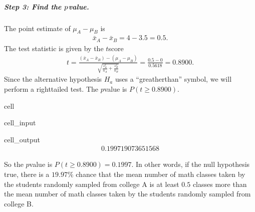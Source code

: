 \documentclass[letterpaper,10pt,english]{jupyterBook}
\begin{document}
\subparagraph{Step 3: Find the  \protect\(p\protect\)\sphinxhyphen{}value.}
\label{\detokenize{Ch9 Hypothesis Tests of Two or More Populations/9.1 Hypothesis Testing Two Population Means:step-3-find-the-p-value}}
\sphinxAtStartPar
The point estimate of \(\mu_A - \mu_B\) is
\begin{equation*}
\begin{split} \bar{x}_A - \bar{x}_B = 4 - 3.5 = 0.5. \end{split}
\end{equation*}
\sphinxAtStartPar
The test statistic is given by the \(t\)\sphinxhyphen{}score
\begin{equation*}
\begin{split} t = \frac{(\bar{x}_A - \bar{x}_B) - (\mu_A - \mu_B)}{\sqrt{\frac{s_A^2}{n_A} + \frac{s_B^2}{n_B}}} = \frac{0.5 - 0}{0.5618} = 0.8900. \end{split}
\end{equation*}
\sphinxAtStartPar
Since the alternative hypothesis \(H_a\) uses a “greather\sphinxhyphen{}than” symbol, we will perform a right\sphinxhyphen{}tailed test. The \(p\)\sphinxhyphen{}value is \(P(t \geq 0.8900)\).

\begin{sphinxuseclass}{cell}\begin{sphinxVerbatimInput}

\begin{sphinxuseclass}{cell_input}
\begin{sphinxVerbatim}[commandchars=\\\{\}]
\end{sphinxVerbatim}

\end{sphinxuseclass}\end{sphinxVerbatimInput}
\begin{sphinxVerbatimOutput}

\begin{sphinxuseclass}{cell_output}\begin{equation*}
\begin{split}0.199719073651568\end{split}
\end{equation*}
\end{sphinxuseclass}\end{sphinxVerbatimOutput}

\end{sphinxuseclass}
\sphinxAtStartPar
So the \(p\)\sphinxhyphen{}value is \(P(t \geq 0.8900) = 0.1997\). In other words, if the null hypothesis  true, there is a \(19.97\%\) chance that the mean number of math classes taken by the students randomly sampled from college A is at least \(0.5\) classes more than the mean number of math classes taken by the students randomly sampled from college B.
\end{document}
